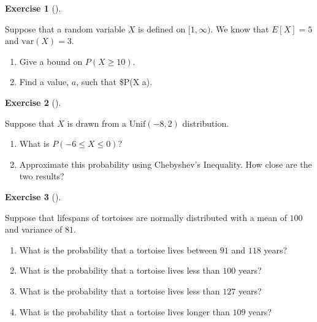 \documentclass[
  letterpaper,
  DIV=11,
  numbers=noendperiod]{scrreprt}
\providecommand{\tightlist}{%
  \setlength{\itemsep}{0pt}\setlength{\parskip}{0pt}}\usepackage{longtable,booktabs,array}
\theoremstyle{definition}
\newtheorem{exercise}{Exercise}[chapter]
\theoremstyle{definition}
\theoremstyle{definition}
\theoremstyle{remark}
\begin{document}
\begin{exercise}[]\protect\hypertarget{exr-9.9}{}\label{exr-9.9}

Suppose that a random variable \(X\) is defined on \([1,\infty)\). We
know that \(E[X] = 5\) and \(\text{var}(X) = 3\).

\begin{enumerate}
\def\labelenumi{\alph{enumi}.}
\tightlist
\item
  Give a bound on \(P(X \geq 10)\).
\item
  Find a value, \(a\), such that \$P(X \geq a).
\end{enumerate}

\end{exercise}

\begin{exercise}[]\protect\hypertarget{exr-9.10}{}\label{exr-9.10}

Suppose that \(X\) is drawn from a \(\text{Unif}(-8,2)\) distribution.

\begin{enumerate}
\def\labelenumi{\alph{enumi}.}
\tightlist
\item
  What is \(P(-6 \leq X \leq 0)\)?
\item
  Approximate this probability using Chebyshev's Inequality. How close
  are the two results?
\end{enumerate}

\end{exercise}

\begin{exercise}[]\protect\hypertarget{exr-9.11}{}\label{exr-9.11}

Suppose that lifespans of tortoises are normally distributed with a mean
of \(100\) and variance of \(81\).

\begin{enumerate}
\def\labelenumi{\alph{enumi}.}
\tightlist
\item
  What is the probability that a tortoise lives between \(91\) and
  \(118\) years?
\item
  What is the probability that a tortoise lives less than \(100\) years?
\item
  What is the probability that a tortoise lives less than \(127\) years?
\item
  What is the probability that a tortoise lives longer than \(109\)
  years?
\end{enumerate}

\end{exercise}
\end{document}
